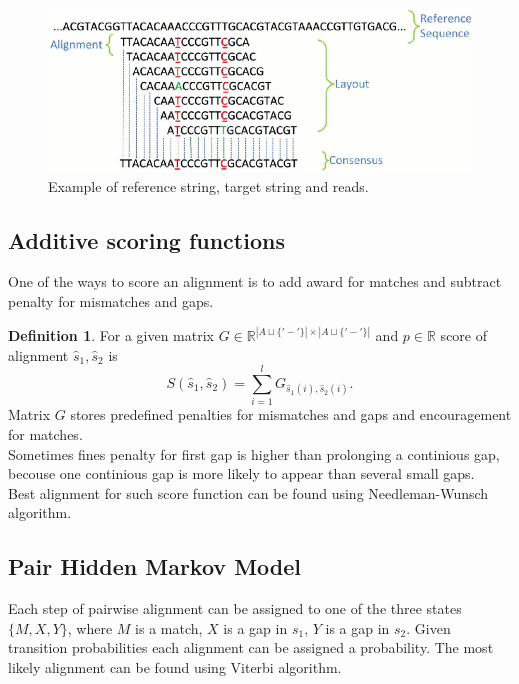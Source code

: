 \documentclass[a4paper, 12pt]{article}
\theoremstyle{definition}
\newtheorem{definition}{Definition}[section]
\theoremstyle{definition}
\theoremstyle{remark}
\begin{document}
\begin{figure}[H]
    \includegraphics[scale=0.5]{aligned_reads.png}
    \centering
    \caption{Example of reference string, target string and reads.}
\end{figure}

\subsection{Additive scoring functions}

One of the ways to score an alignment is to add award for matches and 
subtract penalty for mismatches and gaps. 

\begin{definition}    
    For a given matrix $G \in \mathbb{R}^{|A \sqcup \{ '-' \} | \times |A \sqcup \{ '-' \}|}$ and $p \in \mathbb{R}$ 
    score of alignment $\hat{s}_1, \hat{s}_2$ is 
    $$ S(\hat{s}_1, \hat{s}_2) = \sum_{i = 1}^l G_{\hat{s}_1(i), \hat{s}_2(i)}. $$
    Matrix $G$ stores predefined penalties for mismatches and 
    gaps and encouragement for matches. \\
    Sometimes fines penalty for first gap is higher than prolonging a continious gap, 
    becouse one continious gap is more likely to appear than several small gaps. \\
    Best alignment for such score function can be found using Needleman-Wunsch algorithm.

\end{definition}

\subsection{Pair Hidden Markov Model}
Each step of pairwise alignment can be assigned to one of 
the three states $\{ M, X, Y\}$, where $M$ is a match, 
$X$ is a gap in $s_1$, $Y$ is a gap in $s_2$. 
Given transition probabilities each alignment can be assigned a probability.
The most likely alignment can be found using Viterbi algorithm.
\end{document}
